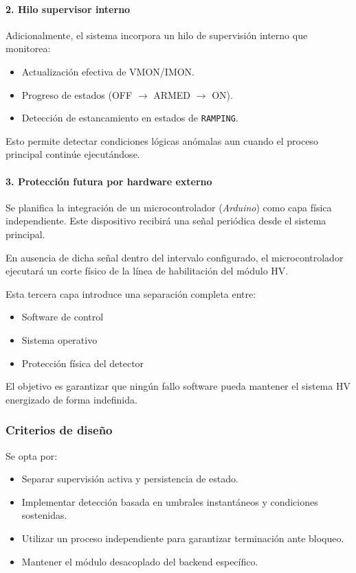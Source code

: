 \documentclass{article}
\begin{document}
\paragraph{2. Hilo supervisor interno}

Adicionalmente, el sistema incorpora un hilo de supervisión interno que
monitorea:

\begin{itemize}
    \item Actualización efectiva de VMON/IMON.
    \item Progreso de estados (OFF $\rightarrow$ ARMED $\rightarrow$ ON).
    \item Detección de estancamiento en estados de \texttt{RAMPING}.
\end{itemize}

Esto permite detectar condiciones lógicas anómalas aun cuando el proceso
principal continúe ejecutándose.

\paragraph{3. Protección futura por hardware externo}

Se planifica la integración de un microcontrolador (\emph{Arduino})
como capa física independiente. Este dispositivo recibirá una señal
periódica desde el sistema principal.

En ausencia de dicha señal dentro del intervalo configurado,
el microcontrolador ejecutará un corte físico de la línea de habilitación
del módulo HV.

Esta tercera capa introduce una separación completa entre:

\begin{itemize}
    \item Software de control
    \item Sistema operativo
    \item Protección física del detector
\end{itemize}

El objetivo es garantizar que ningún fallo software pueda mantener
el sistema HV energizado de forma indefinida.


\subsubsection{Criterios de diseño}

Se opta por:

\begin{itemize}
\item Separar supervisión activa y persistencia de estado.
\item Implementar detección basada en umbrales instantáneos y condiciones sostenidas.
\item Utilizar un proceso independiente para garantizar terminación ante bloqueo.
\item Mantener el módulo desacoplado del backend específico.
\end{itemize}
\end{document}
